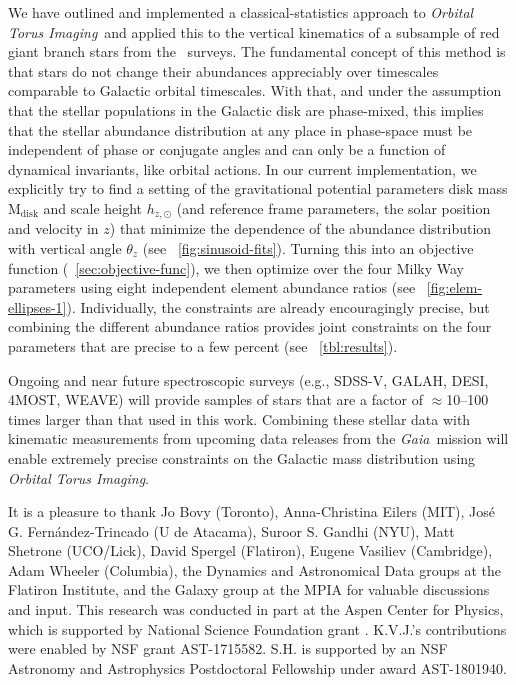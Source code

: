 \documentclass[modern]{aastex63}
\newcommand{\methodname}{\textsl{Orbital Torus Imaging}}
\newcommand{\gaia}{\textsl{Gaia}}
\newcommand{\apogee}{\acronym{APOGEE}}
\newcommand{\mdisk}{\ensuremath{\mathrm{M}_\mathrm{disk}}}
\newcommand{\hz}{\ensuremath{h_{z, \odot}}}
\begin{document}
We have outlined and implemented a classical-statistics approach to \methodname\
and applied this to the vertical kinematics of a subsample of red giant branch
stars from the \apogee\ surveys.
The fundamental concept of this method is that stars do not change their
abundances appreciably over timescales comparable to Galactic orbital
timescales.
With that, and under the assumption that the stellar populations in the Galactic
disk are phase-mixed, this implies that the stellar abundance distribution at
any place in phase-space must be independent of phase or conjugate angles and
can only be a function of dynamical invariants, like orbital actions.
In our current implementation, we explicitly try to find a setting of the
gravitational potential parameters disk mass $\mdisk$ and scale height $\hz$
(and reference frame parameters, the solar position and velocity in $z$) that
minimize the dependence of the abundance distribution with vertical angle
$\theta_z$ (see \figurename~\ref{fig:sinusoid-fits}).
Turning this into an objective function (\sectionname~\ref{sec:objective-func}),
we then optimize over the four Milky Way parameters using eight independent
element abundance ratios (see \figurename~\ref{fig:elem-ellipses-1}).
Individually, the constraints are already encouragingly precise, but combining
the different abundance ratios provides joint constraints on the four parameters
that are precise to a few percent (see \tablename~\ref{tbl:results}).

Ongoing and near future spectroscopic surveys (e.g., SDSS-V, GALAH, DESI, 4MOST,
WEAVE) will provide samples of stars that are a factor of $\approx$10--100
times larger than that used in this work.
Combining these stellar data with kinematic measurements from upcoming data
releases from the \gaia\ mission will enable extremely precise constraints on
the Galactic mass distribution using \methodname.


\acknowledgments
It is a pleasure to thank
  Jo Bovy (Toronto),
  Anna-Christina Eilers (MIT),
  Jos\'e G. Fern\'andez-Trincado (U de Atacama),
  Suroor S. Gandhi (NYU),
  Matt Shetrone (UCO/Lick),
  David Spergel (Flatiron),
  Eugene Vasiliev (Cambridge),
  Adam Wheeler (Columbia),
  the Dynamics and Astronomical Data groups at the Flatiron Institute,
  and the Galaxy group at the MPIA
for valuable discussions and input.
This research was conducted in part at the Aspen Center for Physics,
which is supported by National Science Foundation grant .
K.V.J.'s contributions were enabled by NSF grant AST-1715582.
S.H. is supported by an NSF Astronomy and Astrophysics Postdoctoral Fellowship
under award AST-1801940.
\end{document}

